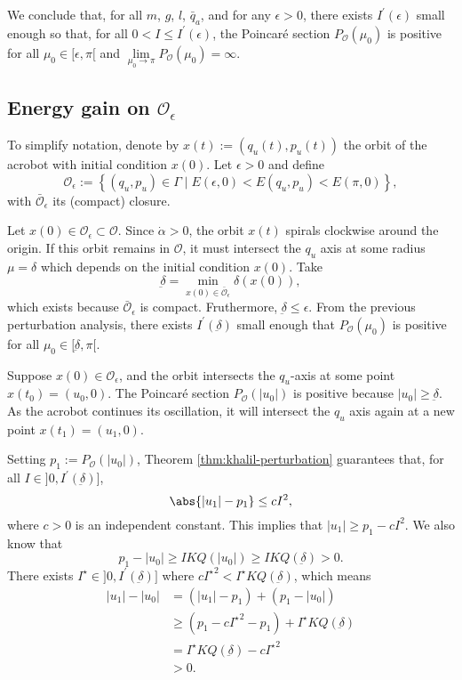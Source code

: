 We conclude that, for all \(m\), \(g\), \(l\), \(\bar{q}_a\), and for
any \(\epsilon > 0\), there exists \(I^\prime(\epsilon)\) small enough so that,
for all \(0 < I \leq I^\prime(\epsilon)\),
the Poincar\'{e} section \(P_\mathcal{O}(\mu_0)\) is positive for all
\(\mu_0 \in [\epsilon,\pi[\) and 
\(\lim \limits_{\mu_0 \to \pi} P_\mathcal{O}(\mu_0) = \infty\).

\subsection*{Energy gain on \(\mathcal{O}_\epsilon\)}
To simplify notation, denote by \(x(t) := (q_u(t),p_u(t))\) the orbit of the
acrobot with initial condition \(x(0)\).
Let \(\epsilon > 0\) and define
\[
    \mathcal{O}_\epsilon := \left\{(q_u,p_u) \in \Gamma
    \mid E(\epsilon,0) < E(q_u,p_u) < E(\pi,0)\right\}
    ,
\]
with \(\bar{\mathcal{O}}_\epsilon\) its (compact) closure.

Let \(x(0) \in \mathcal{O}_\epsilon \subset \mathcal{O}\).
Since \(\dot{\alpha} > 0\), the orbit \(x(t)\) spirals clockwise around
the origin.
If this orbit remains in \(\mathcal{O}\), it must intersect
the \(q_u\) axis at some radius \(\mu = \delta\)
which depends on the initial condition \(x(0)\).
Take 
\[
    \underbar{\delta} = 
    \min\limits_{x(0) \in \bar{\mathcal{O}}_\epsilon} \delta(x(0))
    ,
\] 
which exists because \(\bar{\mathcal{O}}_\epsilon\) is compact.
Fruthermore, \(\underbar{\delta} \leq \epsilon\).
From the previous perturbation analysis,
there exists \(I^\prime(\underbar{\delta})\) small enough that
\(P_\mathcal{O}(\mu_0)\) is positive for all 
\(\mu_0 \in [\underbar{\delta},\pi[\).

Suppose \(x(0) \in \mathcal{O}_\epsilon\), and the orbit
intersects the \(q_u\)-axis at some point \(x(t_0) = (u_0, 0)\).
The Poincar\'{e} section \(P_\mathcal{O}(|u_0|)\) is positive because 
\(|u_0| \geq \underbar{\delta}\).
As the acrobot continues its oscillation, it will intersect the \(q_u\) axis
again at a new point \(x(t_1) = (u_1,0)\).

Setting \(p_1 := P_\mathcal{O}(|u_0|)\),
Theorem \ref{thm:khalil-perturbation} guarantees that,
for all \(I \in ]0,I^\prime(\underbar{\delta})]\),
\[
    \abs{|u_1| - p_1} \leq cI^2
    ,
\]
where \(c > 0\) is an independent constant.
This implies that \(|u_1| \geq p_1 - cI^2\). 
We also know that
\[
    p_1 - |u_0| \geq IKQ(|u_0|) \geq IKQ(\underbar{\delta}) > 0
    .
\]
There exists \(I^\star \in ]0,I^\prime(\underbar{\delta})]\) where
\(c{I^\star}^2 < I^\star KQ(\underbar{\delta})\), which means
\begin{align*}
    |u_1| - |u_0| 
    &= \left(|u_1| - p_1\right) + \left(p_1 - |u_0|\right)
    \\
    &\geq \left(p_1 - c{I^\star}^2 - p_1\right) + I^\star KQ(\underbar{\delta})
    \\
    &= I^\star KQ(\underbar{\delta}) - c{I^\star}^2
    \\
    &> 0
    .
\end{align*}

